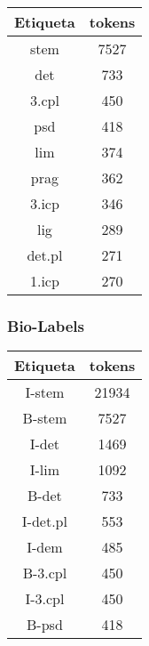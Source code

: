 \documentclass[letterpaper,12pt,oneside]{book}
\begin{document}
\begin{center}
	\begin{tabular}{c | c}                            
		\textbf{Etiqueta} & \textbf{tokens} \\ \hline \hline
		stem & 7527 \\

		det & 733 \\

		3.cpl & 450 \\

		psd & 418 \\

		lim & 374 \\

		prag & 362 \\

		3.icp & 346 \\

		lig & 289 \\

		det.pl & 271 \\

		1.icp & 270 \\
	\end{tabular}

\end{center}

\subsubsection{Bio-Labels}
\begin{center}
	\begin{tabular}{c | c}
		\textbf{Etiqueta} & \textbf{tokens} \\ \hline \hline
		I-stem & 21934 \\

		B-stem & 7527 \\

		I-det & 1469 \\

		I-lim & 1092 \\

		B-det & 733 \\

		I-det.pl & 553 \\

		I-dem & 485 \\

		B-3.cpl & 450 \\

		I-3.cpl & 450 \\

		B-psd & 418 \\

	\end{tabular}
\end{center}
\end{document}
